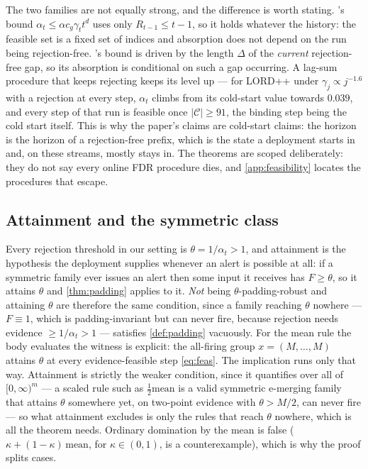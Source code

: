 \documentclass[conference]{IEEEtran}
\newcommand{\Cal}{\mathcal{C}}
\newcommand{\nCal}{\lvert\Cal\rvert}
\newcommand{\ceil}{M}
\newcommand{\alphat}{\alpha_t}
\begin{document}
The two families are not equally strong, and the difference is worth stating. 's
bound $\alphat\le\alpha c_g\gamma_t t^d$ uses only $R_{t-1}\le t-1$, so it holds whatever the history:
the feasible set is a fixed set of indices and absorption does not depend on the run being
rejection-free. 's bound is driven by the length $\Delta$ of the \emph{current}
rejection-free gap, so its absorption is conditional on such a gap occurring. A lag-sum procedure that
keeps rejecting keeps its level up --- for LORD++ under $\gamma_j\propto j^{-1.6}$ with a rejection at
every step, $\alphat$ climbs from its cold-start value towards $0.039$, and every step of that run is
feasible once $\nCal\ge91$, the binding step being the cold start itself. This is why the
paper's claims are cold-start claims: the horizon is the horizon of a rejection-free prefix, which is
the state a deployment starts in and, on these streams, mostly stays in. The theorems are scoped
deliberately: they do not say every online FDR procedure dies, and \cref{app:feasibility} locates the
procedures that escape.

\subsection{Attainment and the symmetric class}\label{app:attain}

Every rejection threshold in our setting is $\theta=1/\alphat>1$, and attainment is the hypothesis the
deployment supplies whenever an alert is possible at all: if a symmetric family ever issues an alert then
some input it receives has $F\ge\theta$, so it attains $\theta$ and \cref{thm:padding} applies to it.
\emph{Not} being $\theta$-padding-robust and attaining $\theta$ are therefore the same condition, since a
family reaching $\theta$ nowhere --- $F\equiv1$, which is padding-invariant but can never fire, because
rejection needs evidence $\ge1/\alphat>1$ --- satisfies \cref{def:padding} vacuously. For the mean rule
the body evaluates the witness is explicit: the all-firing group $x=(\ceil,\ldots,\ceil)$ attains
$\theta$ at every evidence-feasible step \eqref{eq:feas}. The implication runs only that way. Attainment is strictly the weaker condition, since it quantifies over
all of $[0,\infty)^m$ --- a scaled rule such as $\tfrac12\mathrm{mean}$ is a valid symmetric e-merging
family that attains $\theta$ somewhere yet, on two-point evidence with $\theta>\ceil/2$, can never fire
--- so what attainment excludes is only the rules that reach $\theta$ nowhere, which is all the theorem
needs. Ordinary domination by the mean is false ($\kappa+(1-\kappa)\,\mathrm{mean}$, for
$\kappa\in(0,1)$, is a counterexample), which is why the proof splits cases.
\end{document}
